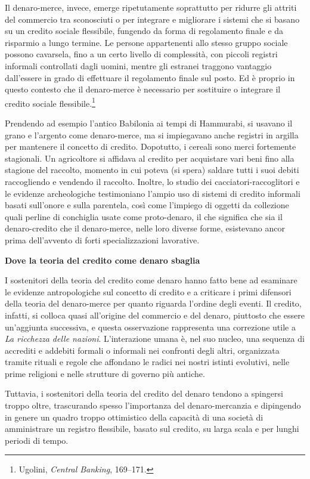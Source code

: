\documentclass[
  a5paper,
  smalldemyvopaper,10pt,twoside,onecolumn,openright,extrafontsizes,hidelinks]{memoir}
\begin{document}
Il denaro-merce, invece, emerge ripetutamente soprattutto per ridurre
gli attriti del commercio tra sconosciuti o per integrare e migliorare i
sistemi che si basano su un credito sociale flessibile, fungendo da
forma di regolamento finale e da risparmio a lungo termine. Le persone
appartenenti allo stesso gruppo sociale possono cavarsela, fino a un
certo livello di complessità, con piccoli registri informali controllati
dagli uomini, mentre gli estranei traggono vantaggio dall'essere in
grado di effettuare il regolamento finale sul posto. Ed è proprio in
questo contesto che il denaro-merce è necessario per sostituire o
integrare il credito sociale flessibile.\footnote{Ugolini, \emph{Central
  Banking}, 169--171.}

Prendendo ad esempio l'antico Babilonia ai tempi di Hammurabi, si
usavano il grano e l'argento come denaro-merce, ma si impiegavano anche
registri in argilla per mantenere il concetto di credito. Dopotutto, i
cereali sono merci fortemente stagionali. Un agricoltore si affidava al
credito per acquistare vari beni fino alla stagione del raccolto,
momento in cui poteva (si spera) saldare tutti i suoi debiti
raccogliendo e vendendo il raccolto. Inoltre, lo studio dei
cacciatori-raccoglitori e le evidenze archeologiche testimoniano l'ampio
uso di sistemi di credito informali basati sull'onore e sulla parentela,
così come l'impiego di oggetti da collezione quali perline di conchiglia
usate come proto-denaro, il che significa che sia il denaro-credito che
il denaro-merce, nelle loro diverse forme, esistevano ancor prima
dell'avvento di forti specializzazioni lavorative.

\textbf{Dove la teoria del credito come denaro sbaglia}

I sostenitori della teoria del credito come denaro hanno fatto bene ad
esaminare le evidenze antropologiche sul concetto di credito e a
criticare i primi difensori della teoria del denaro-merce per quanto
riguarda l'ordine degli eventi. Il credito, infatti, si colloca quasi
all'origine del commercio e del denaro, piuttosto che essere un'aggiunta
successiva, e questa osservazione rappresenta una correzione utile a
\emph{La ricchezza delle nazioni}. L'interazione umana è, nel suo
nucleo, una sequenza di accrediti e addebiti formali o informali nei
confronti degli altri, organizzata tramite rituali e regole che
affondano le radici nei nostri istinti evolutivi, nelle prime religioni
e nelle strutture di governo più antiche.

Tuttavia, i sostenitori della teoria del credito del denaro tendono a
spingersi troppo oltre, trascurando spesso l'importanza del
denaro-mercanzia e dipingendo in genere un quadro troppo ottimistico
della capacità di una società di amministrare un registro flessibile,
basato sul credito, su larga scala e per lunghi periodi di tempo.
\end{document}
